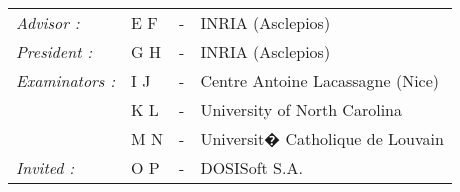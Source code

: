 \begin{titlepage}
\begin{center}
\begin{tabular}{llcl}
      \textit{Advisor :}	& E \textsc{F}		& - & INRIA (Asclepios)\\
      \textit{President :}	& G \textsc{H}		& - & INRIA (Asclepios)\\
      \textit{Examinators :}   & I \textsc{J}          & - & Centre Antoine Lacassagne (Nice)\\
      				& K \textsc{L}			& - & University of North Carolina\\
      				& M \textsc{N}		& - & Universit� Catholique de Louvain\\
      \textit{Invited :}		& O \textsc{P}		& - & DOSISoft S.A.
\end{tabular}
\end{center}
\end{titlepage}
\sloppy

\titlepage
